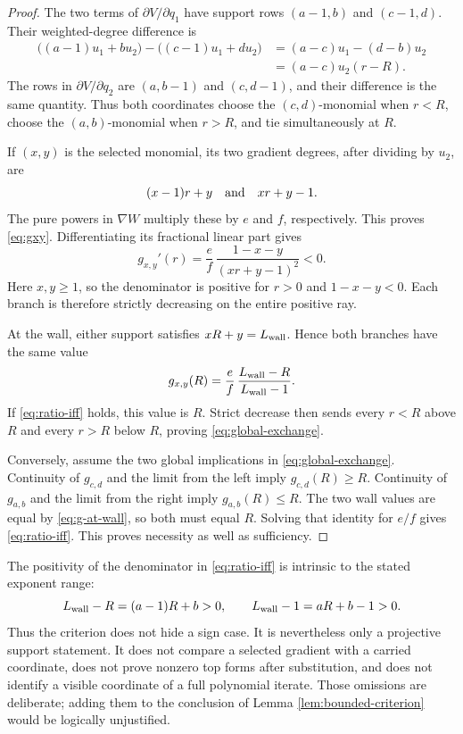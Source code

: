 \documentclass[11pt]{article}
\theoremstyle{definition}
\theoremstyle{remark}
\begin{document}
\begin{proof}
The two terms of \(\partial V/\partial q_1\) have support rows
\((a-1,b)\) and \((c-1,d)\).  Their weighted-degree difference is
\begin{align*}
\bigl((a-1)u_1+bu_2\bigr)
-\bigl((c-1)u_1+du_2\bigr)
&=(a-c)u_1-(d-b)u_2\\
&=(a-c)u_2(r-R).
\end{align*}
The rows in \(\partial V/\partial q_2\) are \((a,b-1)\) and
\((c,d-1)\), and their difference is the same quantity.  Thus both
coordinates choose the \((c,d)\)-monomial when \(r<R\), choose the
\((a,b)\)-monomial when \(r>R\), and tie simultaneously at \(R\).

If \((x,y)\) is the selected monomial, its two gradient degrees, after
dividing by \(u_2\), are
\[
(x-1)r+y
\quad\hbox{and}\quad
xr+y-1.
\]
The pure powers in \(\nabla W\) multiply these by \(e\) and \(f\),
respectively.  This proves \eqref{eq:gxy}.  Differentiating its fractional
linear part gives
\begin{equation}
g_{x,y}'(r)=\frac ef\,
\frac{1-x-y}{(xr+y-1)^2}<0.
\label{eq:g-derivative}
\end{equation}
Here \(x,y\geq1\), so the denominator is positive for \(r>0\) and
\(1-x-y<0\).  Each branch is therefore strictly decreasing on the entire
positive ray.

At the wall, either support satisfies \(xR+y=L_{\mathrm{wall}}\).  Hence both branches
have the same value
\begin{equation}
g_{x,y}(R)=\frac ef\,
\frac{L_{\mathrm{wall}}-R}{L_{\mathrm{wall}}-1}.
\label{eq:g-at-wall}
\end{equation}
If \eqref{eq:ratio-iff} holds, this value is \(R\).  Strict decrease then
sends every \(r<R\) above \(R\) and every \(r>R\) below \(R\), proving
\eqref{eq:global-exchange}.

Conversely, assume the two global implications in
\eqref{eq:global-exchange}.  Continuity of \(g_{c,d}\) and the limit from
the left imply \(g_{c,d}(R)\geq R\).  Continuity of \(g_{a,b}\) and the
limit from the right imply \(g_{a,b}(R)\leq R\).  The two wall values are
equal by \eqref{eq:g-at-wall}, so both must equal \(R\).  Solving that
identity for \(e/f\) gives \eqref{eq:ratio-iff}.  This proves necessity as
well as sufficiency.
\end{proof}

The positivity of the denominator in \eqref{eq:ratio-iff} is intrinsic to
the stated exponent range:
\[
L_{\mathrm{wall}}-R=(a-1)R+b>0,\qquad L_{\mathrm{wall}}-1=aR+b-1>0.
\]
Thus the criterion does not hide a sign case.  It is nevertheless only a
projective support statement.  It does not compare a selected gradient with
a carried coordinate, does not prove nonzero top forms after substitution,
and does not identify a visible coordinate of a full polynomial iterate.
Those omissions are deliberate; adding them to the conclusion of Lemma
\ref{lem:bounded-criterion} would be logically unjustified.
\end{document}
